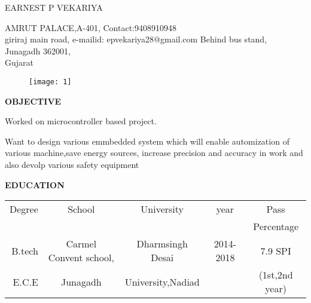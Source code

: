 \documentclass{article}
\begin{document}
 \begin{center}
 	 {
 	 	\large { EARNEST P VEKARIYA}
 	 }
 	
 \end{center}
   \hline
 \begin{flushleft}
 	AMRUT PALACE,A-401, 		\hspace{2.3in}    		    Contact:9408910948             \\
 	giriraj main road, 		\hspace{2.8in}		    	e-mailid: epvekariya28@gmail.com
 	Behind bus stand, \\
	Junagadh 362001,     \\
 	Gujarat       \\
 \end{flushleft}
 \vspace{-0.3in}



 \begin{figure}[h]
    \hspace{4.4in}
	\texttt{[image: 1]}
 \end{figure}
 
 
  \begin{flushleft}
  	\textbf{OBJECTIVE}
  	
  	\vspace{-0.20in}
  	\hspace{1.5in}
  	Worked on microcontroller based project.\item Want to design various emmbedded system which will enable automization of various machine,save energy sources, increase precision and accuracy in work and also devolp various safety equipment
  \end{flushleft}
  
   \begin{flushleft}
   	\textbf{EDUCATION}
   	\hspace{0.45in}
   	\begin{tabular}{|r|c|c|c|c|}
   		\hline
   		Degree & School & University &  year & Pass   \\
   		&        &            &              & Percentage\\
   		\hline
   		
   		B.tech & Carmel Convent school, & Dharmsingh Desai & 2014-2018 &7.9 SPI\\
   		E.C.E	&Junagadh & University,Nadiad& &(1st,2nd year) \\
   		\hline
   	\end{tabular}
   \end{flushleft}
 
\end{document}
